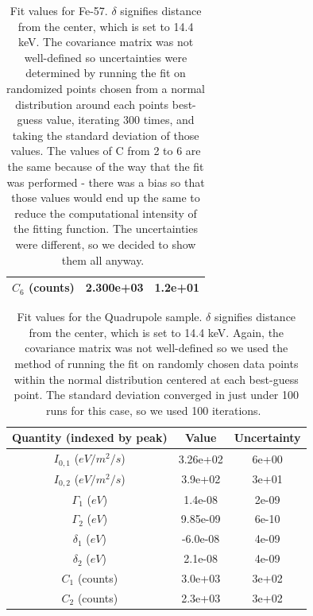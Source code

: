 \documentclass[reprint, nobibnotes, amssymb, amsmath, amsfonts, mathtools, mathrsfs, floatfix]{revtex4-1}
\begin{document}
\begin{table}[h]
\begin{tabular}{|c|c|c|}
           $C_6$ (counts) & 2.300e+03 & 1.2e+01 \\ \hline
        \end{tabular}
        \caption{Fit values for Fe-57.  $\delta$ signifies distance from the center, which is set to 14.4 keV.  The covariance matrix was not well-defined so uncertainties were determined by running the fit on randomized points chosen from a normal distribution around each points best-guess value, iterating 300 times, and taking the standard deviation of those values.  The values of C from 2 to 6 are the same because of the way that the fit was performed - there was a bias so that those values would end up the same to reduce the computational intensity of the fitting function.  The uncertainties were different, so we decided to show them all anyway.~\label{tab:fe_57_fit}}
      \end{table}

      \begin{table}[h]
        \begin{tabular}{|c|c|c|}
          \hline
          Quantity (indexed by peak) & Value & Uncertainty \\ \hline \hline
          $I_{0, 1}$ ($eV/m^2/s$) & 3.26e+02 & 6e+00 \\ \hline
          $I_{0, 2}$ ($eV/m^2/s$)& 3.9e+02 & 3e+01 \\ \hline \hline
          $\Gamma_1$ ($eV$) & 1.4e-08 & 2e-09 \\ \hline
          $\Gamma_2$ ($eV$) & 9.85e-09 & 6e-10 \\ \hline \hline
          $\delta_{1}$ ($eV$) & -6.0e-08 & 4e-09 \\ \hline
          $\delta_{2}$ ($eV$) & 2.1e-08 & 4e-09 \\ \hline \hline
          $C_1$ (counts) & 3.0e+03 & 3e+02 \\ \hline
          $C_2$ (counts) & 2.3e+03 & 3e+02 \\ \hline
        \end{tabular}
        \caption{Fit values for the Quadrupole sample.  $\delta$ signifies distance from the center, which is set to 14.4 keV.  Again, the covariance matrix was not well-defined so we used the method of running the fit on randomly chosen data points within the normal distribution centered at each best-guess point.  The standard deviation converged in just under 100 runs for this case, so we used 100 iterations.~\label{tab:quad_fit}}
      \end{table}
\end{document}

